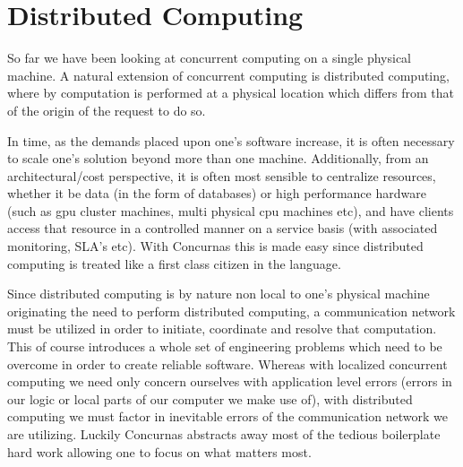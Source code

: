 \documentclass[conc-doc]{subfiles}
\begin{document}
	
	\chapter[Distributed Computing]{Distributed Computing}
	\label{ch:distComp}



So far we have been looking at concurrent computing on a single physical machine. A natural extension of concurrent computing is distributed computing, where by computation is performed at a physical location which differs from that of the origin of the request to do so.

In time, as the demands placed upon one's software increase, it is often necessary to scale one's solution beyond more than one machine. Additionally, from an architectural/cost perspective, it is often most sensible to centralize resources, whether it be data (in the form of databases) or high performance hardware (such as gpu cluster machines, multi physical cpu machines etc), and have clients access that resource in a controlled manner on a service basis (with associated monitoring, SLA's etc). With Concurnas this is made easy since distributed computing is treated like a first class citizen in the language.


Since distributed computing is by nature non local to one's physical machine originating the need to perform distributed computing, a communication network must be utilized in order to initiate, coordinate and resolve that computation. This of course introduces a whole set of engineering problems which need to be overcome in order to create reliable software. Whereas with localized concurrent computing we need only concern ourselves with application level errors (errors in our logic or local parts of our computer we make use of), with distributed computing we must factor in inevitable errors of the communication network we are utilizing. Luckily Concurnas abstracts away most of the tedious boilerplate hard work allowing one to focus on what matters most.
\end{document}
